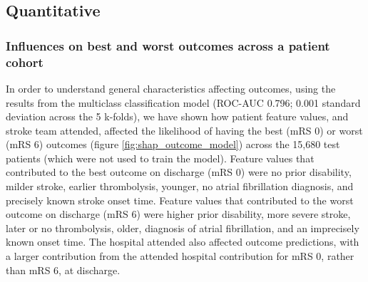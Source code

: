 \subsection{Quantitative}

\subsubsection{Influences on best and worst outcomes across a patient cohort}

In order to understand general characteristics affecting outcomes, using the results from the multiclass classification model (ROC-AUC 0.796; 0.001 standard deviation across the 5 k-folds), we have shown how patient feature values, and stroke team attended, affected the likelihood of having the best (mRS 0) or worst (mRS 6) outcomes (figure \ref{fig:shap_outcome_model}) across the 15,680 test patients (which were not used to train the model). Feature values that contributed to the best outcome on discharge (mRS 0) were no prior disability, milder stroke, earlier thrombolysis, younger, no atrial fibrillation diagnosis, and precisely known stroke onset time. Feature values that contributed to the worst outcome on discharge (mRS 6) were higher prior disability, more severe stroke, later or no thrombolysis, older, diagnosis of atrial fibrillation, and an imprecisely known onset time. The hospital attended also affected outcome predictions, with a  larger contribution from the attended hospital contribution for mRS 0, rather than mRS 6, at discharge. 

